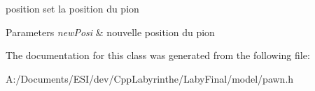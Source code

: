 position set la position du pion 


\begin{DoxyParams}{Parameters}
{\em new\+Posi} & nouvelle position du pion \\
\hline
\end{DoxyParams}


The documentation for this class was generated from the following file\+:\begin{DoxyCompactItemize}
\item 
A\+:/\+Documents/\+E\+S\+I/dev/\+Cpp\+Labyrinthe/\+Laby\+Final/model/pawn.\+h\end{DoxyCompactItemize}
